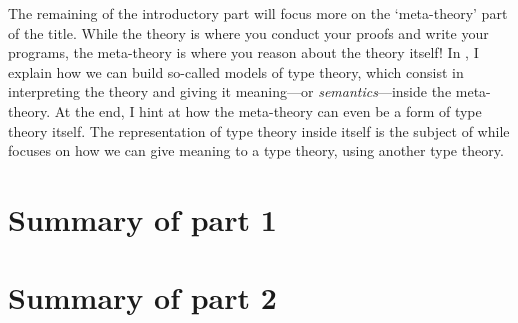The remaining of the introductory part will focus more on the `meta-theory'
part of the title. While the theory is where you conduct your proofs and write
your programs, the meta-theory is where you reason about the theory itself!
In , I explain how we can build so-called models of type theory,
which consist in interpreting the theory and giving it meaning---or
\emph{semantics}---inside the meta-theory. At the end, I hint at how the
meta-theory can even be a form of type theory itself. The representation of
type theory inside itself is the subject of  while
 focuses on how we can give meaning to a type theory, using
another type theory.

\section{Summary of part 1}


\section{Summary of part 2}


